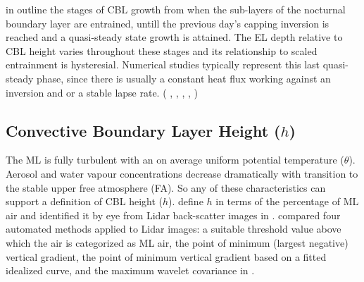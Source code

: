 \citeauthor{StullNelEl} in \cite{StullNelEl} outline the stages of \acs{CBL} growth from when the sub-layers of the nocturnal
boundary layer are entrained, untill the previous day's capping inversion is reached and a quasi-steady state growth 
is attained.  The \acs{EL} depth relative to \acs{CBL} height varies throughout these stages and its relationship
to scaled entrainment is hysteresial.  Numerical studies typically represent this last quasi-steady
phase, since there is usually a constant heat flux working against an inversion and or a stable lapse rate. 
(\citeauthor{SchmidtSchu} \cite{SchmidtSchu}, \citeauthor{Sorbjan} \cite{Sorbjan}, \citeauthor{SullMoengStev} \cite{SullMoengStev}, 
\citeauthor{FedConzMir04} \cite{FedConzMir04}, \citeauthor{BrooksFowler2} \cite{BrooksFowler2})  

\subsection{Convective Boundary Layer Height ($h$)}
\label{subsec:}

The \acs{ML} is fully turbulent with an on average uniform potential temperature ($\theta$). Aerosol and water vapour concentrations 
decrease dramatically with transition to the stable upper free atmosphere (\acs{FA}).  So any of these characteristics can support
a definition of \acs{CBL} height ($h$).  \citeauthor{StullNelEl} define $h$ in terms of the percentage of \acs{ML} air
and identified it by eye from Lidar back-scatter images in \cite{StullNelEl}.  \citeauthor{Traum11} compared
four automated methods applied to Lidar images: a suitable threshold value 
above which the air is categorized as \acs{ML} air,  the point of minimum (largest negative) 
vertical gradient, the point of minimum vertical gradient based on a fitted idealized curve, 
and the maximum wavelet covariance in \cite{Traum11}.\\

